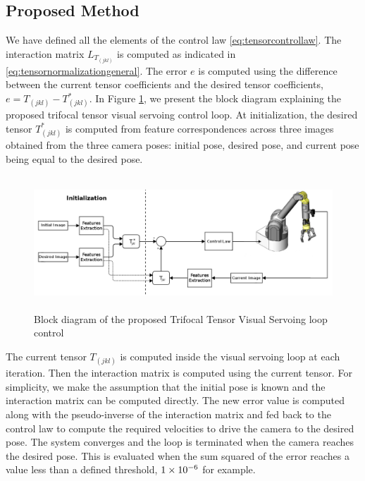 \subsection{Proposed Method}
We have defined all the elements of the control law \eqref{eq:tensorcontrollaw}. The interaction matrix $L_{T_{(jkl)}}$ is computed as indicated in \eqref{eq:tensornormalizationgeneral}. The error $e$ is computed using the difference between the current tensor coefficients and the desired tensor coefficients, $e = T_{(jkl)} - T_{(jkl)}^{*}$. In Figure \ref{fig:vsttloop}, we present the block diagram explaining the proposed trifocal tensor visual servoing control loop. At initialization, the desired tensor $T_{(jkl)}^{*}$ is computed from feature correspondences across three images obtained from the three camera poses: initial pose, desired pose, and current pose being equal to the desired pose.
\begin{figure}[ht!]
  \centering
  \includegraphics[width=150mm,height=50mm]{figures/vsttloop.png}
  \caption{Block diagram of the proposed Trifocal Tensor Visual Servoing loop control}
  \label{fig:vsttloop}
\end{figure}

The current tensor $T_{(jkl)}$ is computed inside the visual servoing loop at each iteration. Then the interaction matrix is computed using the current tensor. For simplicity, we make the assumption that the initial pose is known and the interaction matrix can be computed directly. The new error value is computed along with the pseudo-inverse of the interaction matrix and fed back to the control law to compute the required velocities to drive the camera to the desired pose. The system converges and the loop is terminated when the camera reaches the desired pose. This is evaluated when the sum squared of the error reaches a value less than a defined threshold, $1 \times 10^{-6}$ for example.
